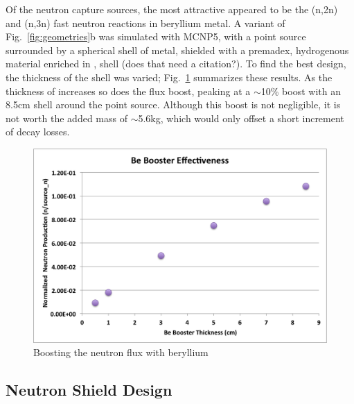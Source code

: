 \documentclass{mc2015}
\begin{document}
Of the neutron capture sources, the most attractive appeared to be the (n,2n) and (n,3n) fast neutron reactions in beryllium metal. A variant of Fig.\ \ref{fig:geometries}b was simulated with MCNP5, with a  point source surrounded by a spherical shell of  metal, shielded with a premadex, hydrogenous material enriched in , shell (does that need a citation?).
To find the best design, the thickness of the  shell was varied; Fig.\ \ref{fig:beboosters} summarizes these results. As the thickness of  increases so does the flux boost, peaking at a $\sim$10\% boost with an 8.5cm shell around the point source. Although this boost is not negligible, it is not worth the added mass of $\sim$5.6kg, which would only offset a short increment of  decay losses. 

\begin{figure}
  \centering
  \includegraphics[width=4.5in]{Be_boost.png}
  \caption{Boosting the neutron flux with beryllium}
  \label{fig:beboosters}
\end{figure}

\subsection{Neutron Shield Design}
\label{sec:shields}
\end{document}
